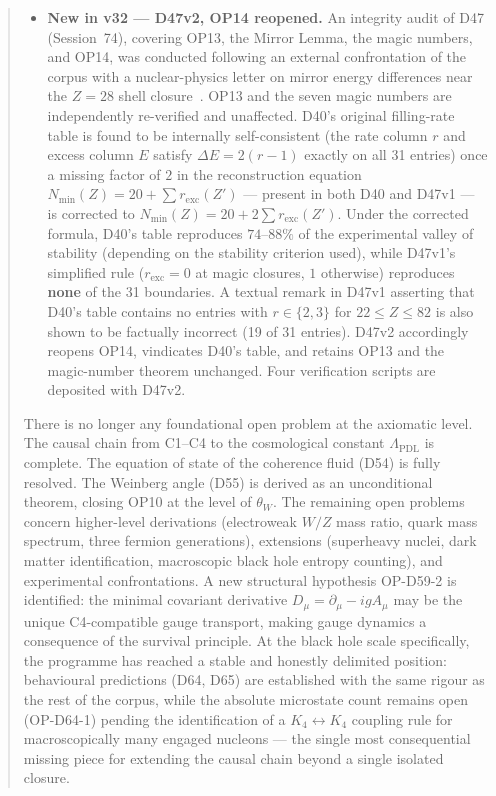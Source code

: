 \documentclass[11pt,a4paper]{article}
\theoremstyle{plain}
\theoremstyle{definition}
\theoremstyle{remark}
\begin{document}
\begin{abstract}
\begin{itemize}
\item \textbf{New in v32 --- D47v2, OP14 reopened.} An integrity audit of D47 (Session~74), covering OP13, the Mirror Lemma, the magic numbers, and OP14, was conducted following an external confrontation of the corpus with a nuclear-physics letter on mirror energy differences near the $Z=28$ shell closure~\cite{Escudeiro2026,Pigliapoco2026}. OP13 and the seven magic numbers are independently re-verified and unaffected. D40's original filling-rate table is found to be internally self-consistent (the rate column $r$ and excess column $E$ satisfy $\Delta E = 2(r-1)$ exactly on all 31 entries) once a missing factor of $2$ in the reconstruction equation $N_{\min}(Z)=20+\sum r_{\mathrm{exc}}(Z')$ --- present in both D40 and D47v1 --- is corrected to $N_{\min}(Z)=20+2\sum r_{\mathrm{exc}}(Z')$. Under the corrected formula, D40's table reproduces $74$--$88\%$ of the experimental valley of stability (depending on the stability criterion used), while D47v1's simplified rule ($r_{\mathrm{exc}}=0$ at magic closures, $1$ otherwise) reproduces \textbf{none} of the 31 boundaries. A textual remark in D47v1 asserting that D40's table contains no entries with $r\in\{2,3\}$ for $22\le Z\le82$ is also shown to be factually incorrect (19 of 31 entries). D47v2 accordingly reopens OP14, vindicates D40's table, and retains OP13 and the magic-number theorem unchanged. Four verification scripts are deposited with D47v2.
\end{itemize}
There is no longer any foundational open problem at the axiomatic level. The causal chain from C1--C4 to the cosmological constant $\Lambda_{\mathrm{PDL}}$ is complete. The equation of state of the coherence fluid (D54) is fully resolved. The Weinberg angle (D55) is derived as an unconditional theorem, closing OP10 at the level of $\theta_W$. The remaining open problems concern higher-level derivations (electroweak $W/Z$ mass ratio, quark mass spectrum, three fermion generations), extensions (superheavy nuclei, dark matter identification, macroscopic black hole entropy counting), and experimental confrontations. A new structural hypothesis OP-D59-2 is identified: the minimal covariant derivative $D_\mu = \partial_\mu - igA_\mu$ may be the unique C4-compatible gauge transport, making gauge dynamics a consequence of the survival principle. At the black hole scale specifically, the programme has reached a stable and honestly delimited position: behavioural predictions (D64, D65) are established with the same rigour as the rest of the corpus, while the absolute microstate count remains open (OP-D64-1) pending the identification of a $K_4\leftrightarrow K_4$ coupling rule for macroscopically many engaged nucleons --- the single most consequential missing piece for extending the causal chain beyond a single isolated closure.
\end{abstract}
\end{document}
